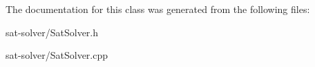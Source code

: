 \-The documentation for this class was generated from the following files\-:\begin{DoxyCompactItemize}
\item 
sat-\/solver/\-Sat\-Solver.\-h\item 
sat-\/solver/\-Sat\-Solver.\-cpp\end{DoxyCompactItemize}
